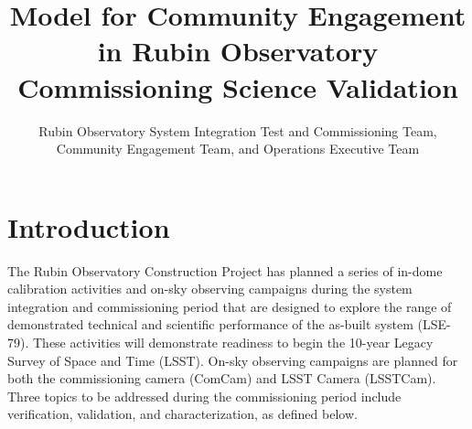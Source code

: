 \documentclass[SE,authoryear,toc]{lsstdoc}
\title{Model for Community Engagement in Rubin Observatory Commissioning Science Validation}
\author{%
Rubin Observatory System Integration Test and Commissioning Team, Community Engagement Team, and Operations Executive Team
}
\date{\vcsDate}
\begin{document}
\maketitle



%

\section{Introduction}

The Rubin Observatory Construction Project has planned a series of in-dome calibration activities and on-sky observing campaigns during the system integration and commissioning period that are designed to explore the range of demonstrated technical and scientific performance of the as-built system (LSE-79). These activities will demonstrate readiness to begin the 10-year Legacy Survey of Space and Time (LSST). 
On-sky observing campaigns are planned for both the commissioning camera (ComCam) and LSST Camera (LSSTCam).
Three topics to be addressed during the commissioning period include verification, validation, and characterization, as defined below.
\end{document}
